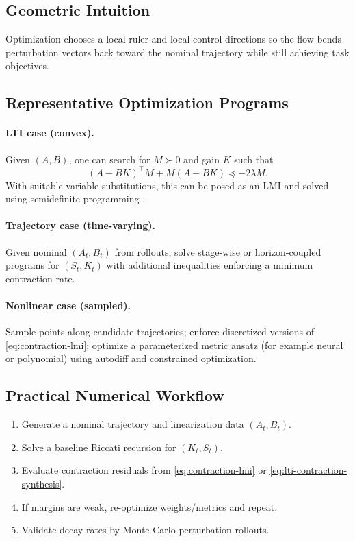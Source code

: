 \documentclass[11pt,letterpaper]{article}
\begin{document}
\subsection{Geometric Intuition}
Optimization chooses a local ruler and local control directions so the flow bends perturbation vectors back toward the nominal trajectory while still achieving task objectives.

\subsection{Representative Optimization Programs}
\paragraph{LTI case (convex).}
Given $(A,B)$, one can search for $M\succ0$ and gain $K$ such that
\begin{equation}
(A-BK)^\top M + M(A-BK) \preceq -2\lambda M.
\label{eq:lti-contraction-synthesis}
\end{equation}
With suitable variable substitutions, this can be posed as an LMI and solved using semidefinite programming \citep{Boyd1994}.

\paragraph{Trajectory case (time-varying).}
Given nominal $(A_t,B_t)$ from rollouts, solve stage-wise or horizon-coupled programs for $(S_t,K_t)$ with additional inequalities enforcing a minimum contraction rate.

\paragraph{Nonlinear case (sampled).}
Sample points along candidate trajectories; enforce discretized versions of \eqref{eq:contraction-lmi}; optimize a parameterized metric ansatz (for example neural or polynomial) using autodiff and constrained optimization.

\subsection{Practical Numerical Workflow}
\begin{enumerate}[label=\arabic*.]
\item Generate a nominal trajectory and linearization data $(A_t,B_t)$.
\item Solve a baseline Riccati recursion for $(K_t,S_t)$.
\item Evaluate contraction residuals from \eqref{eq:contraction-lmi} or \eqref{eq:lti-contraction-synthesis}.
\item If margins are weak, re-optimize weights/metrics and repeat.
\item Validate decay rates by Monte Carlo perturbation rollouts.
\end{enumerate}
\end{document}
